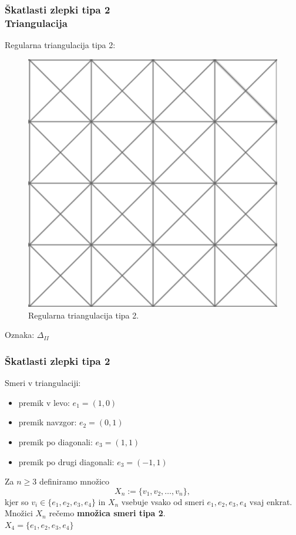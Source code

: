 \documentclass{beamer}
\begin{document}
\begin{frame}
\frametitle{Škatlasti zlepki tipa 2 \\ Triangulacija}

Regularna triangulacija tipa 2: 

\begin{figure}
    \centering
    \includegraphics[scale=0.23]{triangulacija2}
    \caption{Regularna triangulacija tipa 2.}
\end{figure}


Oznaka: $\Delta_{II}$ \\

\end{frame}

\begin{frame}
\frametitle{Škatlasti zlepki tipa 2}

Smeri v triangulaciji:
\begin{itemize}
\item premik v levo: $e_1 = (1,0)$
\item premik navzgor: $e_2 = (0,1)$
\item premik po diagonali: $e_3 = (1,1)$
\item premik po drugi diagonali: $e_3 = (-1,1)$
\end{itemize}

\vspace{5mm}

Za $n \geq 3$ definiramo množico  $$X_n := \{v_1, v_2, \ldots , v_n\},$$ kjer so $v_i \in \{e_1, e_2, e_3, e_4\}$ in $X_n$ vsebuje vsako od smeri $e_1, e_2, e_3, e_4$ vsaj enkrat. \\
Množici $X_n$ rečemo \textbf{množica smeri tipa 2}.\\
\vspace{4mm}
$X_4 = \{e_1,e_2, e_3, e_4\}$

\end{frame}
\end{document}
